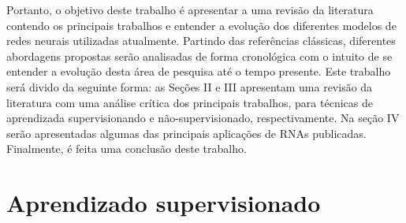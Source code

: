 \documentclass[conference]{IEEEtran}
\begin{document}
	Portanto, o objetivo deste trabalho é apresentar a uma revisão da literatura contendo os principais trabalhos e entender a evolução dos diferentes modelos de redes neurais utilizadas atualmente. Partindo das referências clássicas, diferentes abordagens propostas serão analisadas de forma cronológica com o intuito de se entender a evolução desta área de pesquisa até o tempo presente. Este trabalho será divido da seguinte forma: as Seções II e III apresentam uma revisão da literatura com uma análise crítica dos principais trabalhos, para técnicas de aprendizada supervisionando e não-supervisionado, respectivamente. Na seção IV serão apresentadas algumas das principais aplicações de RNAs publicadas. Finalmente, é feita uma conclusão deste trabalho.
		
	

%
%
	
	\section{Aprendizado supervisionado}
\end{document}

